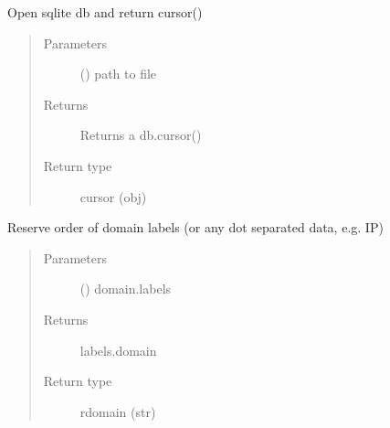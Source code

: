 \documentclass[letterpaper,10pt,english]{sphinxmanual}
\begin{document}
\begin{fulllineitems}
\label{\detokenize{utils:bloxone.utils.opendb}}
\sphinxAtStartPar
Open sqlite db and return cursor()
\begin{quote}\begin{description}
\item[{Parameters}] \leavevmode
\sphinxAtStartPar
{} () \textendash{} path to file

\item[{Returns}] \leavevmode
\sphinxAtStartPar
Returns a db.cursor()

\item[{Return type}] \leavevmode
\sphinxAtStartPar
cursor (obj)

\end{description}\end{quote}

\end{fulllineitems}


\begin{fulllineitems}
\label{\detokenize{utils:bloxone.utils.reverse_labels}}
\sphinxAtStartPar
Reserve order of domain labels (or any dot separated data, e.g. IP)
\begin{quote}\begin{description}
\item[{Parameters}] \leavevmode
\sphinxAtStartPar
{} () \textendash{} domain.labels

\item[{Returns}] \leavevmode
\sphinxAtStartPar
labels.domain

\item[{Return type}] \leavevmode
\sphinxAtStartPar
rdomain (str)

\end{description}\end{quote}

\end{fulllineitems}
\end{document}
